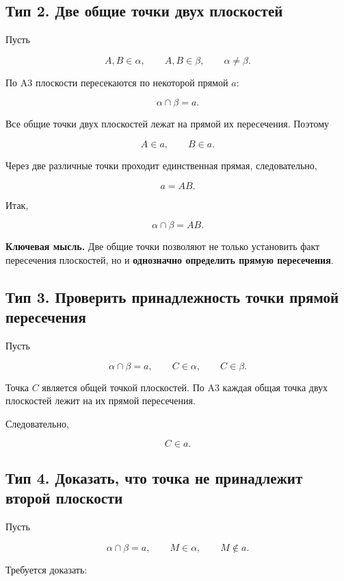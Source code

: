 \documentclass[a4paper,12pt]{article}
\newcommand{\keyidea}[1]{%
  \par\medskip
  {\color{darkaccent}\bfseries Ключевая мысль.} #1
  \par\medskip
}
\begin{document}
\subsection{Тип 2. Две общие точки двух плоскостей}

Пусть

\[
A,B\in\alpha,
\qquad
A,B\in\beta,
\qquad
\alpha\ne\beta.
\]

По A3 плоскости пересекаются по некоторой прямой \(a\):

\[
\alpha\cap\beta=a.
\]

Все общие точки двух плоскостей лежат на прямой их пересечения.
Поэтому

\[
A\in a,\qquad B\in a.
\]

Через две различные точки проходит единственная прямая, следовательно,

\[
a=AB.
\]

Итак,

\[
\boxed{\alpha\cap\beta=AB}.
\]

\keyidea{
Две общие точки позволяют не только установить факт пересечения
плоскостей, но и \textbf{однозначно определить прямую пересечения}.
}


\subsection{Тип 3. Проверить принадлежность точки прямой пересечения}

Пусть

\[
\alpha\cap\beta=a,
\qquad
C\in\alpha,
\qquad
C\in\beta.
\]

Точка \(C\) является общей точкой плоскостей.
По A3 каждая общая точка двух плоскостей лежит
на их прямой пересечения.

Следовательно,

\[
\boxed{C\in a}.
\]


\subsection{Тип 4. Доказать, что точка не принадлежит второй плоскости}

Пусть

\[
\alpha\cap\beta=a,
\qquad
M\in\alpha,
\qquad
M\notin a.
\]

Требуется доказать:
\end{document}
